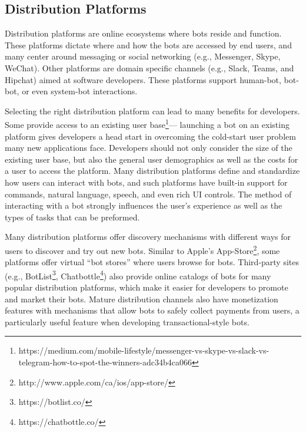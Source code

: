 \documentclass{sig-alternate}
\begin{document}
	\subsection{Distribution Platforms}
	Distribution platforms are online ecosystems where bots reside and function. These platforms dictate where and how the bots are accessed by end users, and many center around messaging or social networking (e.g., Messenger, Skype, WeChat).  Other platforms are domain specific channels (e.g., Slack, Teams, and Hipchat) aimed at software developers.  
	These platforms support human-bot, bot-bot, or even system-bot interactions.  

	Selecting the right distribution platform can lead to many benefits for developers.
	Some provide access to an existing user base\footnote{https://medium.com/mobile-lifestyle/messenger-vs-skype-vs-slack-vs-telegram-how-to-spot-the-winners-adc34b4ca066\label{How_to_spot_the_winners}}---
	launching a bot on an existing platform gives developers a head start in overcoming the cold-start user problem many new applications face. 
	Developers should not only consider the size of the existing user base, but also the general user demographics as well as the costs for a user to access the platform.   
	Many distribution platforms define and standardize how users can interact with bots, and such platforms have built-in support for commands, natural language, speech, and even rich UI controls.  The method of interacting with a bot strongly influences the user's experience as well as the types of tasks that can be preformed.
	
	Many distribution platforms offer discovery mechanisms with different ways for users to discover and try out new bots. Similar to Apple's App-Store\footnote{http://www.apple.com/ca/ios/app-store/}, some platforms offer virtual ``bot stores'' where users browse for bots. Third-party sites (e.g., BotList\footnote{https://botlist.co/}, Chatbottle\footnote{https://chatbottle.co/}) also provide online catalogs of bots for many popular distribution platforms, which make it easier for developers to promote and market their bots. 
	Mature distribution channels also have monetization features with mechanisms that allow bots to safely collect payments from users, a particularly useful feature when developing transactional-style bots.
\end{document}
